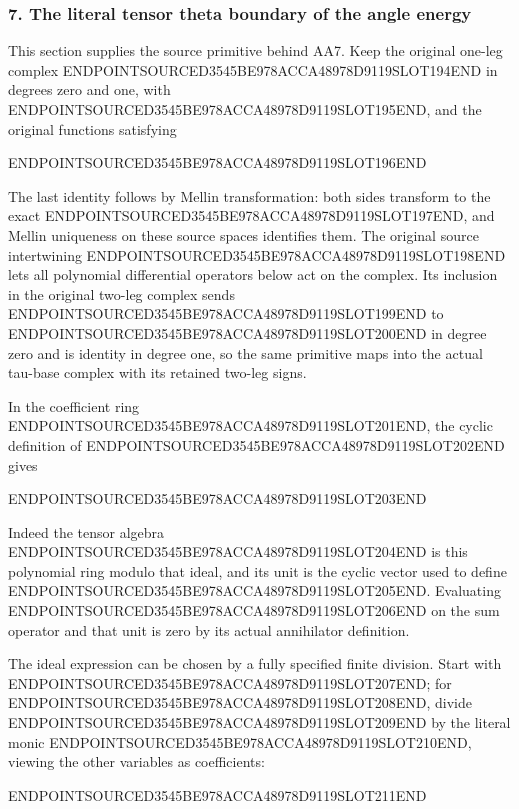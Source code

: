 \subsubsection{7. The literal tensor theta boundary of the angle energy}\label{endpoint-all_degree_angle_review--the-literal-tensor-theta-boundary-of-the-angle-energy}

This section supplies the source primitive behind AA7. Keep the original one-leg complex ENDPOINTSOURCED3545BE978ACCA48978D9119SLOT194END in degrees zero and one, with ENDPOINTSOURCED3545BE978ACCA48978D9119SLOT195END, and the original functions satisfying

ENDPOINTSOURCED3545BE978ACCA48978D9119SLOT196END

The last identity follows by Mellin transformation: both sides transform to the exact ENDPOINTSOURCED3545BE978ACCA48978D9119SLOT197END, and Mellin uniqueness on these source spaces identifies them. The original source intertwining ENDPOINTSOURCED3545BE978ACCA48978D9119SLOT198END lets all polynomial differential operators below act on the complex. Its inclusion in the original two-leg complex sends ENDPOINTSOURCED3545BE978ACCA48978D9119SLOT199END to ENDPOINTSOURCED3545BE978ACCA48978D9119SLOT200END in degree zero and is identity in degree one, so the same primitive maps into the actual tau-base complex with its retained two-leg signs.

In the coefficient ring ENDPOINTSOURCED3545BE978ACCA48978D9119SLOT201END, the cyclic definition of ENDPOINTSOURCED3545BE978ACCA48978D9119SLOT202END gives

ENDPOINTSOURCED3545BE978ACCA48978D9119SLOT203END

Indeed the tensor algebra ENDPOINTSOURCED3545BE978ACCA48978D9119SLOT204END is this polynomial ring modulo that ideal, and its unit is the cyclic vector used to define ENDPOINTSOURCED3545BE978ACCA48978D9119SLOT205END. Evaluating ENDPOINTSOURCED3545BE978ACCA48978D9119SLOT206END on the sum operator and that unit is zero by its actual annihilator definition.

The ideal expression can be chosen by a fully specified finite division. Start with ENDPOINTSOURCED3545BE978ACCA48978D9119SLOT207END; for ENDPOINTSOURCED3545BE978ACCA48978D9119SLOT208END, divide ENDPOINTSOURCED3545BE978ACCA48978D9119SLOT209END by the literal monic ENDPOINTSOURCED3545BE978ACCA48978D9119SLOT210END, viewing the other variables as coefficients:

ENDPOINTSOURCED3545BE978ACCA48978D9119SLOT211END

